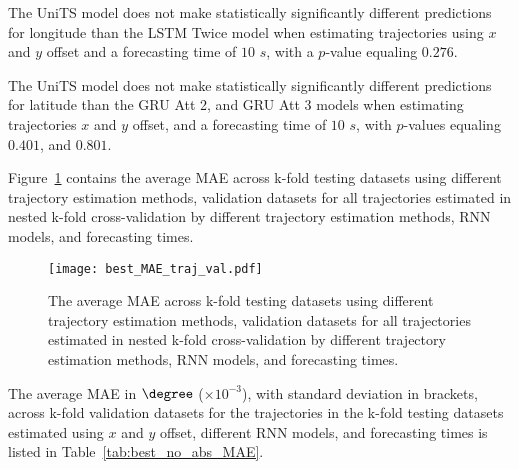 The UniTS model does not make statistically significantly different predictions for longitude than the LSTM Twice model when estimating trajectories using $x$ and $y$ offset and a forecasting time of $10$ $s$, with a $p$-value equaling $0.276$.

The UniTS model does not make statistically significantly different predictions for latitude than the GRU Att 2, and GRU Att 3 models when estimating trajectories $x$ and $y$ offset, and a forecasting time of $10$ $s$, with $p$-values equaling $0.401$, and $0.801$.

Figure~\ref{fig:best_MAE_traj_val} contains the average MAE across k-fold testing datasets using different trajectory estimation methods, validation datasets for all trajectories estimated in nested k-fold cross-validation by different trajectory estimation methods, RNN models, and forecasting times.

\begin{figure}[!ht]
	\centering
	\texttt{[image: best\_MAE\_traj\_val.pdf]}
	\caption{The average MAE across k-fold testing datasets using different trajectory estimation methods, validation datasets for all trajectories estimated in nested k-fold cross-validation by different trajectory estimation methods, RNN models, and forecasting times.}
	\label{fig:best_MAE_traj_val}
\end{figure}

The average MAE in $\degree$ ($\times 10^{-3}$), with standard deviation in brackets, across k-fold validation datasets for the trajectories in the k-fold testing datasets estimated using $x$ and $y$ offset, different RNN models, and forecasting times is listed in Table~\ref{tab:best_no_abs_MAE}.

